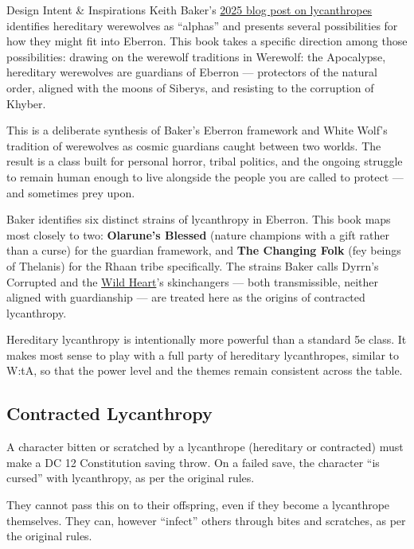 \documentclass[twocolumn]{dndbook}
\begin{document}
\begin{DndSidebar}[float=!b]{Design Intent \& Inspirations}
    Keith Baker's \href{https://keith-baker.com/2025-lycanthropes/}{2025 blog post on lycanthropes} identifies hereditary werewolves as ``alphas'' and presents several possibilities for how they might fit into Eberron.
    This book takes a specific direction among those possibilities: drawing on the werewolf traditions in Werewolf: the Apocalypse, hereditary werewolves are guardians of Eberron --- protectors of the natural order, aligned with the moons of Siberys, and resisting to the corruption of Khyber.

    This is a deliberate synthesis of Baker's Eberron framework and White Wolf's tradition of werewolves as cosmic guardians caught between two worlds.
    The result is a class built for personal horror, tribal politics, and the ongoing struggle to remain human enough to live alongside the people you are called to protect --- and sometimes prey upon.

    Baker identifies six distinct strains of lycanthropy in Eberron.
    This book maps most closely to two: \textbf{Olarune's Blessed} (nature champions with a gift rather than a curse) for the guardian framework, and \textbf{The Changing Folk} (fey beings of Thelanis) for the Rhaan tribe specifically.
    The strains Baker calls Dyrrn's Corrupted and the \href{https://keith-baker.com/2025-lycanthropes/}{Wild Heart}'s skinchangers --- both transmissible, neither aligned with guardianship --- are treated here as the origins of contracted lycanthropy.

    Hereditary lycanthropy is intentionally more powerful than a standard 5e class.
    It makes most sense to play with a full party of hereditary lycanthropes, similar to W:tA, so that the power level and the themes remain consistent across the table.
\end{DndSidebar}

\subsection*{Contracted Lycanthropy}
A character bitten or scratched by a lycanthrope (hereditary or contracted) must make a DC 12 Constitution saving throw.
On a failed save, the character ``is cursed'' with lycanthropy, as per the original rules.\par

They cannot pass this on to their offspring, even if they become a lycanthrope themselves.
They can, however ``infect'' others through bites and scratches, as per the original rules.\par
\end{document}
